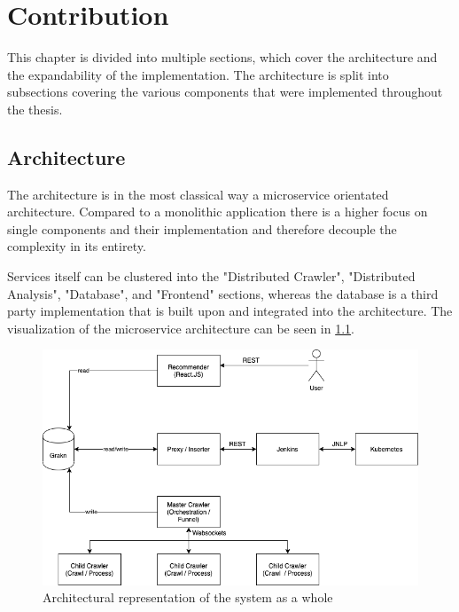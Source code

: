 \chapter{Contribution}

This chapter is divided into multiple sections, which cover the architecture and the expandability of the implementation. The architecture is split into subsections covering the various components that were implemented throughout the thesis.


\section{Architecture}

The architecture is in the most classical way a microservice orientated architecture. Compared to a monolithic application there is a higher focus on single components and their implementation and therefore decouple the complexity in its entirety.

Services itself can be clustered into the "Distributed Crawler", "Distributed Analysis", "Database", and "Frontend" sections, whereas the database is a third party implementation that is built upon and integrated into the architecture. The visualization of the microservice architecture can be seen in \ref{fig:architecture}.

\begin{figure}[H]
    \centering
    \includegraphics[scale=0.5]{graphics/architecture_v2.png}
    \caption{Architectural representation of the system as a whole}
    \label{fig:architecture}
\end{figure}

